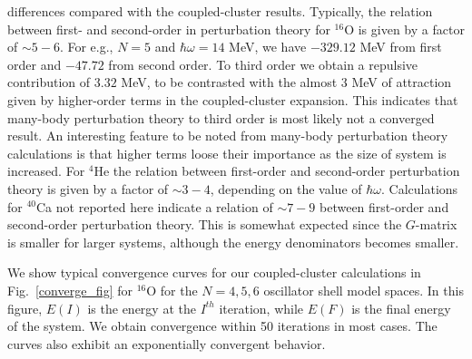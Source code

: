 differences compared with the coupled-cluster results.
Typically, the relation between first- and second-order in perturbation theory
for  $^{16}$O is given by a factor of $\sim 5-6$. For e.g., $N=5$ and 
$\hbar\omega=14$ MeV, we have $-329.12$ MeV from first order and $-47.72$
from second order. To third order we obtain a repulsive contribution of
$3.32$ MeV, to be contrasted with the almost $3$ MeV of attraction given 
by higher-order terms in the coupled-cluster expansion. This indicates that
many-body perturbation theory to third order is
most likely not a converged result. An interesting feature to be noted from
many-body perturbation theory calculations is that higher terms loose their
importance as the size of system is increased. For 
$^{4}$He the relation between first-order and second-order perturbation theory
is given by a factor of $\sim 3-4$, depending on the value of $\hbar\omega$.
Calculations for $^{40}$Ca not reported here indicate a relation of
$\sim 7-9$ between first-order and second-order perturbation theory.
This is somewhat expected since the $G$-matrix is smaller for larger
systems, although the energy denominators becomes smaller.  

We show typical convergence curves for our coupled-cluster calculations 
in Fig.~\ref{converge_fig} for $^{16}$O for the $N=4,5,6$ oscillator
shell model spaces. In this figure, $E(I)$ is the energy at the $I^{th}$
iteration, while $E(F)$ is the final energy of the system. We obtain
convergence within 50 iterations in most cases. The curves also 
exhibit an exponentially convergent behavior. 


